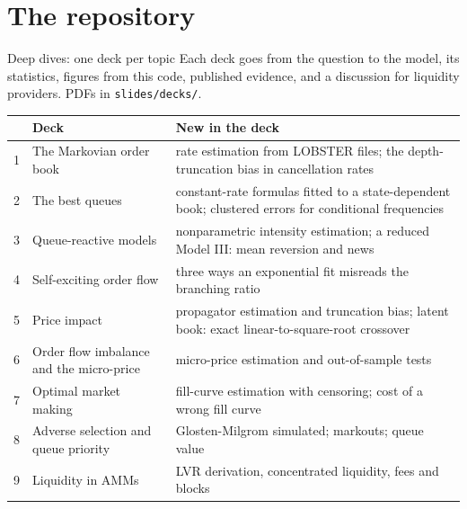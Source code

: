 \section{The repository}

\begin{frame}{Deep dives: one deck per topic}
  \small
  Each deck goes from the question to the model, its statistics, figures from this code, published evidence, and a discussion for liquidity providers. PDFs in \texttt{slides/decks/}.
  \vspace{0.2em}

  \scriptsize
  \begin{tabular}{rp{}p{}}
    \toprule
    & Deck & New in the deck \\
    \midrule
    1 & The Markovian order book & rate estimation from LOBSTER files; the depth-truncation bias in cancellation rates \\
    2 & The best queues & constant-rate formulas fitted to a state-dependent book; clustered errors for conditional frequencies \\
    3 & Queue-reactive models & nonparametric intensity estimation; a reduced Model III: mean reversion and news \\
    4 & Self-exciting order flow & three ways an exponential fit misreads the branching ratio \\
    5 & Price impact & propagator estimation and truncation bias; latent book: exact linear-to-square-root crossover \\
    6 & Order flow imbalance and the micro-price & micro-price estimation and out-of-sample tests \\
    7 & Optimal market making & fill-curve estimation with censoring; cost of a wrong fill curve \\
    8 & Adverse selection and queue priority & Glosten-Milgrom simulated; markouts; queue value \\
    9 & Liquidity in AMMs & LVR derivation, concentrated liquidity, fees and blocks \\
    \bottomrule
  \end{tabular}
\end{frame}

